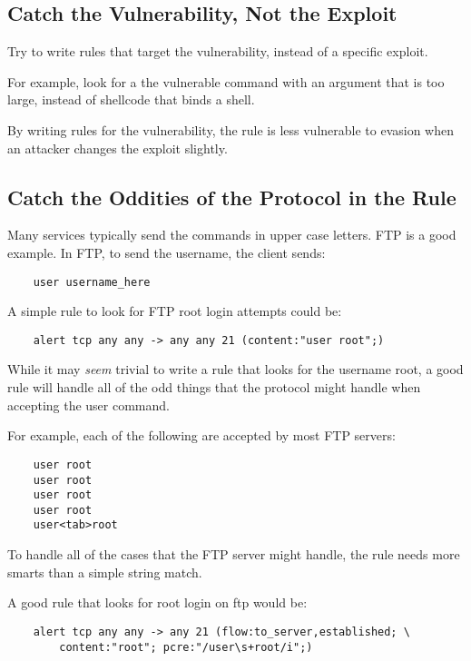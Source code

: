 \documentclass[english]{report}
\begin{document}
\subsection{Catch the Vulnerability, Not the Exploit}

Try to write rules that target the vulnerability, instead of a specific
exploit.

For example, look for a the vulnerable command with an argument that is too
large, instead of shellcode that binds a shell.

By writing rules for the vulnerability, the rule is less vulnerable to evasion
when an attacker changes the exploit slightly.

\subsection{Catch the Oddities of the Protocol in the Rule}

Many services typically send the commands in upper case letters.  FTP is a good
example.  In FTP, to send the username, the client sends:

\begin{verbatim}
    user username_here
\end{verbatim}

A simple rule to look for FTP root login attempts could be:

\begin{verbatim}
    alert tcp any any -> any any 21 (content:"user root";)
\end{verbatim}

While it may \emph{seem} trivial to write a rule that looks for the username
root, a good rule will handle all of the odd things that the protocol might
handle when accepting the user command.

For example, each of the following are accepted by most FTP servers:

\begin{verbatim}
    user root
    user root
    user root
    user root
    user<tab>root
\end{verbatim}

To handle all of the cases that the FTP server might handle, the rule needs
more smarts than a simple string match.

A good rule that looks for root login on ftp would be:

\begin{verbatim}
    alert tcp any any -> any 21 (flow:to_server,established; \
        content:"root"; pcre:"/user\s+root/i";)
\end{verbatim}
\end{document}
